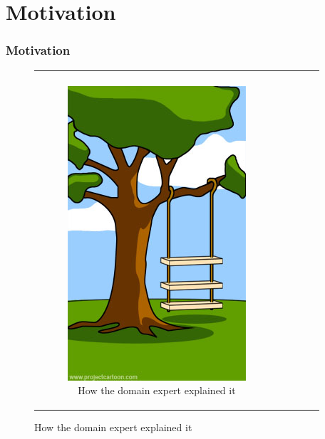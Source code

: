 \documentclass[11 pt,t]{beamer}
\begin{document}
\section{Motivation}
\begin{frame}

  \frametitle{Motivation}
  \begin{figure}[h]
\begin{center}
\begin{tabular}{|c|c|c|c|c|}\hline
&&&&\\
\begin{subfigure}[t]{0.15\textwidth}\centering\includegraphics[width=0.9\columnwidth]{images/howexplained}
\caption*{\tiny \centering How the domain expert explained it}\label{fig:howexplained}\end{subfigure}&

\end{tabular}
\end{center}
\end{figure}
\end{frame}
\end{document}
